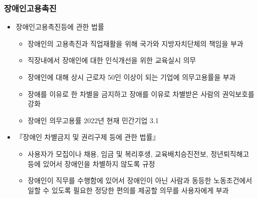 \documentclass[aspectratio=169,xcolor=dvipsnames,handout]{beamer}
\begin{document}
\begin{frame}[allowframebreaks]
    \frametitle{장애인고용촉진}
    \begin{itemize}[<+->]
        \item 장애인고용촉진등에 관한 법률
        \begin{itemize}
            \item 장애인의 고용촉진과 직업재활을 위해 국가와 지방자치단체의 책임을 부과
            \item 직장내에서 장애인에 대한 인식개선을 위한 교육실시 의무
            \item 장애인에 대해 상시 근로자 50인 이상이 되는 기업에 의무고용률을 부과
            \item 장애를 이유로 한 차별을 금지하고 장애를 이유로 차별받은 사람의 권익보호를 강화
            \item 장애인 의무고용률 2022년 현재 민간기업 3.1%
        \end{itemize}
        \framebreak%
        \item 『장애인 차별금지 및 권리구제 등에 관한 법률』
        \begin{itemize}
            \item 사용자가 모집이나 채용, 임금 및 복리후생, 교육배치승진전보, 정년퇴직해고 등에 있어서 장애인을 차별하지 않도록 규정 
            \item 장애인이 직무를 수행함에 있어서 장애인이 아닌 사람과 동등한 노동조건에서 일할 수 있도록 필요한 정당한 편의를 제공할 의무를 사용자에게 부과
        \end{itemize}
    \end{itemize}
\end{frame}
\end{document}
